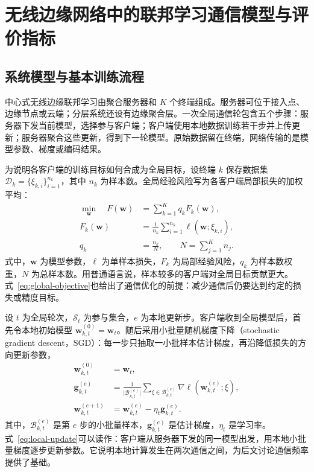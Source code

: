 \section{无线边缘网络中的联邦学习通信模型与评价指标}\label{sec:system-model}

\subsection{系统模型与基本训练流程}\label{subsec:training-model}

中心式无线边缘联邦学习由聚合服务器和 \(K\) 个终端组成。服务器可位于接入点、边缘节点或云端；分层系统还设有边缘聚合层\cite{Tran2019WirelessOptimization,Liu2020HierarchicalFL}。一次全局通信轮包含五个步骤：服务器下发当前模型，选择参与客户端；客户端使用本地数据训练若干步并上传更新；服务器聚合这些更新，得到下一轮模型。原始数据留在终端，网络传输的是模型参数、梯度或编码结果\cite{McMahan2017FedAvg}。

为说明各客户端的训练目标如何合成为全局目标，设终端 \(k\) 保存数据集 \(\mathcal D_k=\{\xi_{k,i}\}_{i=1}^{n_k}\)，其中 \(n_k\) 为样本数。全局经验风险写为各客户端局部损失的加权平均：
\begin{equation}\label{eq:global-objective}
  \begin{aligned}
    \min_{\bm w}\quad F(\bm w)
      &= \sum_{k=1}^{K} q_k F_k(\bm w), \\
    F_k(\bm w)
      &= \frac{1}{n_k}\sum_{i=1}^{n_k}
         \ell(\bm w;\xi_{k,i}), \\
    q_k&=\frac{n_k}{N},
    \qquad N=\sum_{j=1}^{K}n_j .
  \end{aligned}
\end{equation}
式中，\(\bm w\) 为模型参数，\(\ell\) 为单样本损失，\(F_k\) 为局部经验风险，\(q_k\) 为样本数权重，\(N\) 为总样本数。用普通语言说，样本较多的客户端对全局目标贡献更大。式~\eqref{eq:global-objective}也给出了通信优化的前提：减少通信后仍要达到约定的损失或精度目标。

设 \(t\) 为全局轮次，\(\mathcal S_t\) 为参与集合，\(e\) 为本地更新步。客户端收到全局模型后，首先令本地初始模型 \(\bm w_{k,t}^{(0)}=\bm w_t\)。随后采用小批量随机梯度下降（stochastic gradient descent，SGD）：每一步只抽取一小批样本估计梯度，再沿降低损失的方向更新参数，
\begin{equation}\label{eq:local-update}
  \begin{aligned}
    \bm w_{k,t}^{(0)}&=\bm w_t,\\
    \bm g_{k,t}^{(e)}
      &=\frac{1}{\lvert\mathcal B_{k,t}^{(e)}\rvert}
        \sum_{\xi\in\mathcal B_{k,t}^{(e)}}
        \nabla\ell\!\left(\bm w_{k,t}^{(e)};\xi\right),\\
    \bm w_{k,t}^{(e+1)}
      &=\bm w_{k,t}^{(e)}-\eta_t\bm g_{k,t}^{(e)}.
  \end{aligned}
\end{equation}
其中，\(\mathcal B_{k,t}^{(e)}\) 是第 \(e\) 步的小批量样本，\(\bm g_{k,t}^{(e)}\) 是估计梯度，\(\eta_t\) 是学习率。式~\eqref{eq:local-update}可以读作：客户端从服务器下发的同一模型出发，用本地小批量梯度逐步更新参数。它说明本地计算发生在两次通信之间，为后文讨论通信频率提供了基础。

